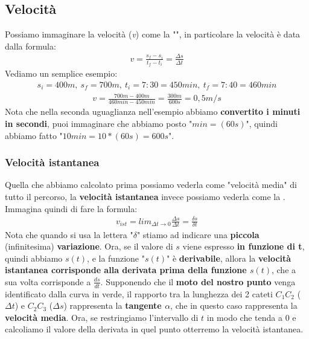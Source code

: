 	\subsection{Velocità}
		Possiamo immaginare la velocità (\textit{v}) come la "", in particolare la velocità è data dalla formula:
		\begin{align*}
			v=\frac{s_f - s_i}{t_f - t_i} = \frac{\Delta s}{\Delta t}
		\end{align*}
		Vediamo un semplice esempio:
		\begin{align*}
			s_i = 400m,\ s_f = 700m,\ t_i = 7:30 = 450 min,\ t_f = 7:40 = 460 min
		\end{align*}
		\begin{align*}
			v=\frac{700m - 400m}{460min - 450min}=\frac{300m}{600s}=0,5m/s
		\end{align*}
		Nota che nella seconda uguaglianza nell'esempio abbiamo \textbf{convertito i minuti in secondi}, puoi immaginare che abbiamo posto "$min = (60s)$", quindi abbiamo fatto "$10 min = 10 * (60s)= 600s$".

		\subsubsection{Velocità istantanea}
			Quella che abbiamo calcolato prima possiamo vederla come "velocità media" di tutto il percorso, la \textbf{velocità istantanea} invece possiamo vederla come la . Immagina quindi di fare la formula:
			\begin{align*}
				v_{ist}=lim_{\Delta t\rightarrow 0} \frac{\Delta s}{\Delta t} = \frac{\delta s}{\delta t}
			\end{align*}
			Nota che quando si usa la lettera "$\delta$" stiamo ad indicare una \textbf{piccola} (infinitesima) \textbf{variazione}. Ora, se il valore di $s$ viene espresso \textbf{in funzione di t}, quindi abbiamo $s(t)$, e la funzione "$s(t)$" è \textbf{derivabile}, allora la \textbf{velocità istantanea corrisponde alla derivata prima della funzione $s(t)$}, che a sua volta corrisponde a $\frac{ds}{dt}$.
			Supponendo che il \textbf{moto del nostro punto} venga identificato dalla curva in verde, il rapporto tra la lunghezza dei 2 cateti $C_1C_2$ ($\Delta t$) e $C_2C_3$ ($\Delta s$) rappresenta la \textbf{tangente $\alpha$}, che in questo caso rappresenta la \textbf{velocità media}. Ora, se restringiamo l'intervallo di $t$ in modo che tenda a 0 e calcoliamo il valore della derivata in quel punto otterremo la velocità istantanea.

